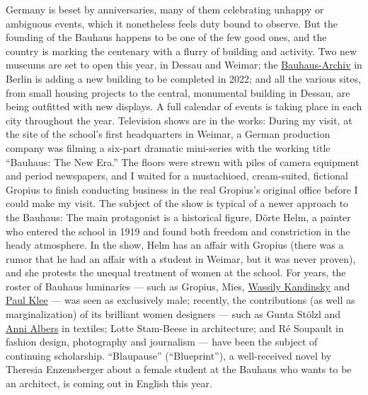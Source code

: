 Germany is beset by anniversaries, many of them celebrating unhappy or
ambiguous events, which it nonetheless feels duty bound to observe. But
the founding of the Bauhaus happens to be one of the few good ones, and
the country is marking the centenary with a flurry of building and
activity. Two new museums are set to open this year, in Dessau and
Weimar; the \href{https://www.bauhaus.de/en/}{Bauhaus-Archiv} in Berlin
is adding a new building to be completed in 2022; and all the various
sites, from small housing projects to the central, monumental building
in Dessau, are being outfitted with new displays. A full calendar of
events is taking place in each city throughout the year. Television
shows are in the works: During my visit, at the site of the school's
first headquarters in Weimar, a German production company was filming a
six-part dramatic mini-series with the working title ``Bauhaus: The New
Era.'' The floors were strewn with piles of camera equipment and period
newspapers, and I waited for a mustachioed, cream-suited, fictional
Gropius to finish conducting business in the real Gropius's original
office before I could make my visit. The subject of the show is typical
of a newer approach to the Bauhaus: The main protagonist is a historical
figure, Dörte Helm, a painter who entered the school in 1919 and found
both freedom and constriction in the heady atmosphere. In the show, Helm
has an affair with Gropius (there was a rumor that he had an affair with
a student in Weimar, but it was never proven), and she protests the
unequal treatment of women at the school. For years, the roster of
Bauhaus luminaries --- such as Gropius, Mies,
\href{https://www.nytimes3xbfgragh.onion/search?query=Kandinsky\%252C+Wassily}{Wassily
Kandinsky} and
\href{https://www.nytimes3xbfgragh.onion/search?query=Klee\%252C+Paul}{Paul
Klee} --- was seen as exclusively male; recently, the contributions (as
well as marginalization) of its brilliant women designers --- such as
Gunta Stölzl and
\href{https://www.nytimes3xbfgragh.onion/2018/10/08/arts/tate-modern-anni-albers-retrospective.html}{Anni
Albers} in textiles; Lotte Stam-Beese in architecture; and Ré Soupault
in fashion design, photography and journalism --- have been the subject
of continuing scholarship. ``Blaupause'' (``Blueprint''), a
well-received novel by Theresia Enzensberger about a female student at
the Bauhaus who wants to be an architect, is coming out in English this
year.

